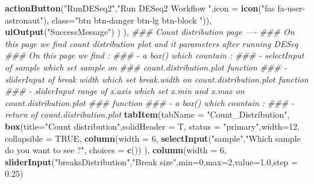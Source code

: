 \documentclass[
  12pt,
]{article}
\newenvironment{Shaded}{\begin{snugshade}}{\end{snugshade}}
\newcommand{\CommentTok}[1]{\textcolor[rgb]{0.56,0.35,0.01}{\textit{#1}}}
\newcommand{\DataTypeTok}[1]{\textcolor[rgb]{0.13,0.29,0.53}{#1}}
\newcommand{\DecValTok}[1]{\textcolor[rgb]{0.00,0.00,0.81}{#1}}
\newcommand{\FloatTok}[1]{\textcolor[rgb]{0.00,0.00,0.81}{#1}}
\newcommand{\KeywordTok}[1]{\textcolor[rgb]{0.13,0.29,0.53}{\textbf{#1}}}
\newcommand{\NormalTok}[1]{#1}
\newcommand{\OtherTok}[1]{\textcolor[rgb]{0.56,0.35,0.01}{#1}}
\newcommand{\StringTok}[1]{\textcolor[rgb]{0.31,0.60,0.02}{#1}}
\begin{document}
\begin{Shaded}
\begin{Highlighting}[]
                          \KeywordTok{actionButton}\NormalTok{(}\StringTok{"RunDESeq2"}\NormalTok{,}\StringTok{"Run DESeq2 Workflow "}\NormalTok{,}\DataTypeTok{icon =} \KeywordTok{icon}\NormalTok{(}\StringTok{"fas fa-user-astronaut"}\NormalTok{), }
                                       \DataTypeTok{class=}\StringTok{"btn btn-danger btn-lg btn-block "}\NormalTok{)),}
                      \KeywordTok{uiOutput}\NormalTok{(}\StringTok{"SuccessMessage"}\NormalTok{)}
\NormalTok{                          )}
\NormalTok{                    ),}
            \CommentTok{### Count distribution page ----}
            \CommentTok{### On this page we find count distribution plot and it parameters after running DESeq}
            \CommentTok{### On this page we find :}
            \CommentTok{###     - a box() which countain :}
            \CommentTok{###         - selectInput of sample which set sample on }
            \CommentTok{###           count.distribution.plot function}
            \CommentTok{###         - sliderInput of break width which set break.width on count.distribution.plot function}
            \CommentTok{###         - sliderInput range of x.axis which set x.min and x.max on count.distribution.plot }
            \CommentTok{###           function}
            \CommentTok{###     - a box() which countain :}
            \CommentTok{###         - return of count.distribution.plot }
            \KeywordTok{tabItem}\NormalTok{(}\DataTypeTok{tabName =} \StringTok{"Count_Distribution"}\NormalTok{,}
                    \KeywordTok{box}\NormalTok{(}\DataTypeTok{title=}\StringTok{"Count distribution"}\NormalTok{,}\DataTypeTok{solidHeader =}\NormalTok{ T, }\DataTypeTok{status =} \StringTok{"primary"}\NormalTok{,}\DataTypeTok{width=}\DecValTok{12}\NormalTok{,}
                        \DataTypeTok{collapsible =} \OtherTok{TRUE}\NormalTok{,}
                        \KeywordTok{column}\NormalTok{(}\DataTypeTok{width =} \DecValTok{6}\NormalTok{,}
                               \KeywordTok{selectInput}\NormalTok{(}\StringTok{"sample"}\NormalTok{,}\StringTok{"Which sample do you want to see ?"}\NormalTok{, }\DataTypeTok{choices =} \KeywordTok{c}\NormalTok{())}
\NormalTok{                        ),}
                        \KeywordTok{column}\NormalTok{(}\DataTypeTok{width =} \DecValTok{6}\NormalTok{,}
                               \KeywordTok{sliderInput}\NormalTok{(}\StringTok{"breaksDistribution"}\NormalTok{,}\StringTok{"Break size"}\NormalTok{,}\DataTypeTok{min=}\DecValTok{0}\NormalTok{,}\DataTypeTok{max=}\DecValTok{2}\NormalTok{,}\DataTypeTok{value=}\FloatTok{1.0}\NormalTok{,}\DataTypeTok{step =} \FloatTok{0.25}\NormalTok{)}

\end{Highlighting}
\end{Shaded}
\end{document}
